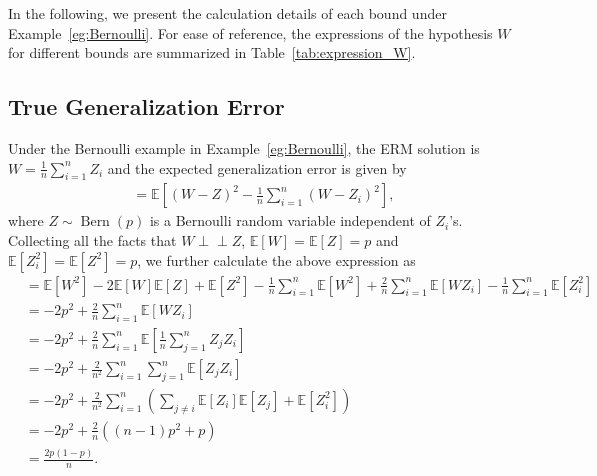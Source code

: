 \documentclass[onecolumn,romanappendices,10pt]{IEEEtran}
\newcommand{\EE}{{\mathbb{E}}}
\DeclareMathOperator{\gen}{\overline{gen}}
\DeclareMathOperator{\Bernoulli}{Bern}
\newcommand\indep{ \perp \!\!\! \perp}
\begin{document}
	In the following, we present the calculation details of each bound under Example~\ref{eg:Bernoulli}. For ease of reference, the expressions of the hypothesis $W$ for different bounds are summarized in Table~\ref{tab:expression_W}.
	
	\subsection{True Generalization Error} \label{subapp:true-gen-err}
	Under the Bernoulli example in Example~\ref{eg:Bernoulli}, the ERM solution is $W = \frac{1}{n} \sum_{i=1}^{n} Z_i$ and the expected generalization error is given by
	\begin{equation}
		\begin{aligned}
			\gen = \EE \left[ \left( W - Z \right)^2 - \frac{1}{n} \sum_{i=1}^{n} \left( W - Z_i \right)^2 \right],
		\end{aligned}
	\end{equation}
	where $Z \sim \Bernoulli(p)$ is a Bernoulli random variable independent of $Z_i$'s. Collecting all the facts that $W \indep Z$, $\EE[W] = \EE[Z] = p$ and $\EE [Z_i^2] = \EE [Z^2] = p$, we further calculate the above expression as
	\begin{equation}
		\begin{aligned}
			\gen &= \EE \left[ W^2 \right] - 2 \EE \left[ W \right] \EE \left[ Z \right] + \EE \left[ Z^2 \right] - \frac{1}{n} \sum_{i=1}^{n} \EE \left[ W^2 \right] + \frac{2}{n} \sum_{i=1}^{n} \EE \left[ W Z_i \right] - \frac{1}{n} \sum_{i=1}^{n} \EE \left[ Z_i^2 \right] \\
			&= -2p^2 + \frac{2}{n} \sum_{i=1}^{n} \EE \left[ W Z_i \right] \\
			&= -2p^2 + \frac{2}{n} \sum_{i=1}^{n} \EE \left[ \frac{1}{n} \sum_{j=1}^{n} Z_j Z_i \right] \\
			&= -2p^2 + \frac{2}{n^2} \sum_{i=1}^{n} \sum_{j=1}^{n} \EE \left[ Z_j Z_i \right] \\
			&= -2p^2 + \frac{2}{n^2} \sum_{i=1}^{n} \left( \sum_{j \not= i} \EE \left[ Z_i \right] \EE \left[ Z_j \right] + \EE \left[ Z_i^2 \right] \right) \\
			&= -2p^2 + \frac{2}{n} \left( (n-1)p^2 + p \right) \\
			&= \frac{2p(1-p)}{n}.
		\end{aligned}
	\end{equation}
	
\end{document}
